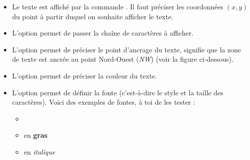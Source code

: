 \documentclass[11pt,class=report,crop=false]{standalone}
\begin{document}
\begin{cours}
\begin{itemize}
  \item Le texte est affiché par la commande . Il faut préciser les coordonnées $(x,y)$ du point à partir duquel on souhaite afficher le texte. 
  
  \item L'option  permet de passer la chaîne de caractères à afficher.
  
  \item L'option  permet de préciser le point d'ancrage du texte,  signifie que la zone de texte est ancrée au point Nord-Ouest (\emph{NW}) (voir la figure ci-dessous).
  
  \item L'option  permet de préciser la couleur du texte.
  
  \item L'option  permet de définir la fonte (c'est-à-dire le style et la taille des caractères). Voici des exemples de fontes, à toi de les tester :
  \begin{itemize}
    \item {} 
    \item {} en \textbf{gras}
    \item {} en \emph{italique}
  \end{itemize}  
\end{itemize}


\end{cours}


\end{document}

